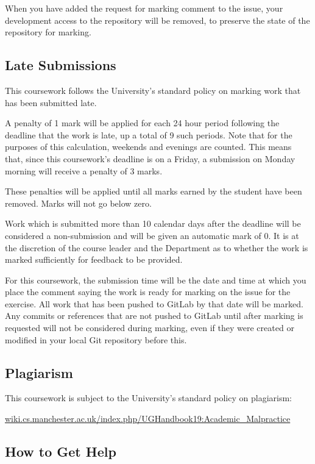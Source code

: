 \documentclass[
]{book}
\begin{document}
When you have added the request for marking comment to the issue, your development access to the repository will be removed, to preserve the state of the repository for marking.

\hypertarget{lateness}{%
\subsection{Late Submissions}\label{lateness}}

This coursework follows the University's standard policy on marking work that has been submitted late.

A penalty of 1 mark will be applied for each 24 hour period following the deadline that the work is late, up a total of 9 such periods. Note that for the purposes of this calculation, weekends and evenings are counted. This means that, since this coursework's deadline is on a Friday, a submission on Monday morning will receive a penalty of 3 marks.

These penalties will be applied until all marks earned by the student have been removed. Marks will not go below zero.

Work which is submitted more than 10 calendar days after the deadline will be considered a non-submission and will be given an automatic mark of 0. It is at the discretion of the course leader and the Department as to whether the work is marked sufficiently for feedback to be provided.

For this coursework, the submission time will be the date and time at which you place the comment saying the work is ready for marking on the issue for the exercise. All work that has been pushed to GitLab by that date will be marked. Any commits or references that are not pushed to GitLab until after marking is requested will not be considered during marking, even if they were created or modified in your local Git repository before this.

\hypertarget{dontcopy}{%
\subsection{Plagiarism}\label{dontcopy}}

This coursework is subject to the University's standard policy on plagiarism:

\href{https://wiki.cs.manchester.ac.uk/index.php/UGHandbook19:Academic_Malpractice}{wiki.cs.manchester.ac.uk/index.php/UGHandbook19:Academic\_Malpractice}

\hypertarget{gettinghelp}{%
\subsection{How to Get Help}\label{gettinghelp}}
\end{document}
